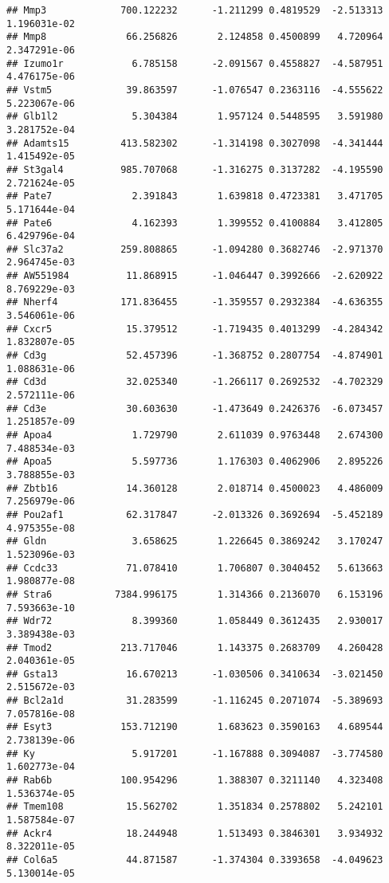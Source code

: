\documentclass[
]{article}
\begin{document}
\begin{verbatim}
## Mmp3             700.122232      -1.211299 0.4819529  -2.513313 1.196031e-02
## Mmp8              66.256826       2.124858 0.4500899   4.720964 2.347291e-06
## Izumo1r            6.785158      -2.091567 0.4558827  -4.587951 4.476175e-06
## Vstm5             39.863597      -1.076547 0.2363116  -4.555622 5.223067e-06
## Glb1l2             5.304384       1.957124 0.5448595   3.591980 3.281752e-04
## Adamts15         413.582302      -1.314198 0.3027098  -4.341444 1.415492e-05
## St3gal4          985.707068      -1.316275 0.3137282  -4.195590 2.721624e-05
## Pate7              2.391843       1.639818 0.4723381   3.471705 5.171644e-04
## Pate6              4.162393       1.399552 0.4100884   3.412805 6.429796e-04
## Slc37a2          259.808865      -1.094280 0.3682746  -2.971370 2.964745e-03
## AW551984          11.868915      -1.046447 0.3992666  -2.620922 8.769229e-03
## Nherf4           171.836455      -1.359557 0.2932384  -4.636355 3.546061e-06
## Cxcr5             15.379512      -1.719435 0.4013299  -4.284342 1.832807e-05
## Cd3g              52.457396      -1.368752 0.2807754  -4.874901 1.088631e-06
## Cd3d              32.025340      -1.266117 0.2692532  -4.702329 2.572111e-06
## Cd3e              30.603630      -1.473649 0.2426376  -6.073457 1.251857e-09
## Apoa4              1.729790       2.611039 0.9763448   2.674300 7.488534e-03
## Apoa5              5.597736       1.176303 0.4062906   2.895226 3.788855e-03
## Zbtb16            14.360128       2.018714 0.4500023   4.486009 7.256979e-06
## Pou2af1           62.317847      -2.013326 0.3692694  -5.452189 4.975355e-08
## Gldn               3.658625       1.226645 0.3869242   3.170247 1.523096e-03
## Ccdc33            71.078410       1.706807 0.3040452   5.613663 1.980877e-08
## Stra6           7384.996175       1.314366 0.2136070   6.153196 7.593663e-10
## Wdr72              8.399360       1.058449 0.3612435   2.930017 3.389438e-03
## Tmod2            213.717046       1.143375 0.2683709   4.260428 2.040361e-05
## Gsta13            16.670213      -1.030506 0.3410634  -3.021450 2.515672e-03
## Bcl2a1d           31.283599      -1.116245 0.2071074  -5.389693 7.057816e-08
## Esyt3            153.712190       1.683623 0.3590163   4.689544 2.738139e-06
## Ky                 5.917201      -1.167888 0.3094087  -3.774580 1.602773e-04
## Rab6b            100.954296       1.388307 0.3211140   4.323408 1.536374e-05
## Tmem108           15.562702       1.351834 0.2578802   5.242101 1.587584e-07
## Ackr4             18.244948       1.513493 0.3846301   3.934932 8.322011e-05
## Col6a5            44.871587      -1.374304 0.3393658  -4.049623 5.130014e-05

\end{verbatim}
\end{document}

